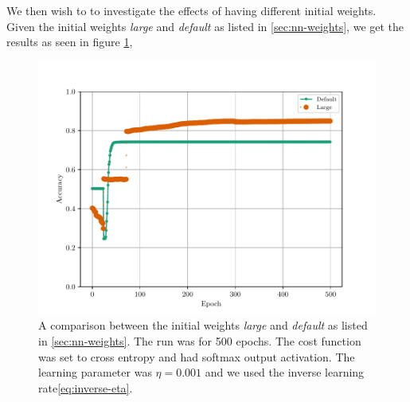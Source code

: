 We then wish to to investigate the effects of having different initial weights. Given the initial weights \textit{large} and \textit{default} as listed in \ref{sec:nn-weights}, we get the results as seen in figure \ref{fig:mlp-epoch-init-weights},
\begin{figure}[H]
    \centering
    \includegraphics[scale=1.0]{../fig/mlp_epoch_weight_inits.pdf}
    \caption{A comparison between the initial weights \textit{large} and \textit{default} as listed in \ref{sec:nn-weights}. The run was for 500 epochs. The cost function was set to cross entropy and had softmax output activation. The learning parameter was $\eta=0.001$ and we used the inverse learning rate\eqref{eq:inverse-eta}.}
    \label{fig:mlp-epoch-init-weights}
\end{figure}

